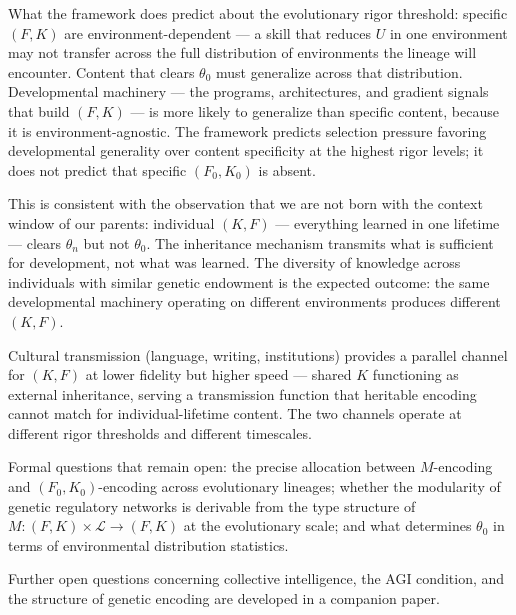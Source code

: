 \documentclass[
]{article}
\begin{document}
\begin{enumerate}
  What the framework does predict about the evolutionary rigor
  threshold: specific \((F, K)\) are environment-dependent --- a skill
  that reduces \(U\) in one environment may not transfer across the full
  distribution of environments the lineage will encounter. Content that
  clears \(\theta_0\) must generalize across that distribution.
  Developmental machinery --- the programs, architectures, and gradient
  signals that build \((F, K)\) --- is more likely to generalize than
  specific content, because it is environment-agnostic. The framework
  predicts selection pressure favoring developmental generality over
  content specificity at the highest rigor levels; it does not predict
  that specific \((F_0, K_0)\) is absent.

  This is consistent with the observation that we are not born with the
  context window of our parents: individual \((K, F)\) --- everything
  learned in one lifetime --- clears \(\theta_n\) but not \(\theta_0\).
  The inheritance mechanism transmits what is sufficient for
  development, not what was learned. The diversity of knowledge across
  individuals with similar genetic endowment is the expected outcome:
  the same developmental machinery operating on different environments
  produces different \((K, F)\).

  Cultural transmission (language, writing, institutions) provides a
  parallel channel for \((K, F)\) at lower fidelity but higher speed ---
  shared \(K\) functioning as external inheritance,
  serving a transmission function that heritable encoding cannot match for
  individual-lifetime content. The two channels operate at different
  rigor thresholds and different timescales.

  Formal questions that remain open: the precise allocation between
  \(M\)-encoding and \((F_0, K_0)\)-encoding across evolutionary
  lineages; whether the modularity of genetic regulatory networks is
  derivable from the type structure of
  \(M : (F, K) \times \mathcal{L} \rightarrow (F, K)\) at the
  evolutionary scale; and what determines \(\theta_0\) in terms of
  environmental distribution statistics.
\end{enumerate}

Further open questions concerning collective intelligence, the AGI
condition, and the structure of genetic encoding are developed in a
companion paper.
\end{document}
